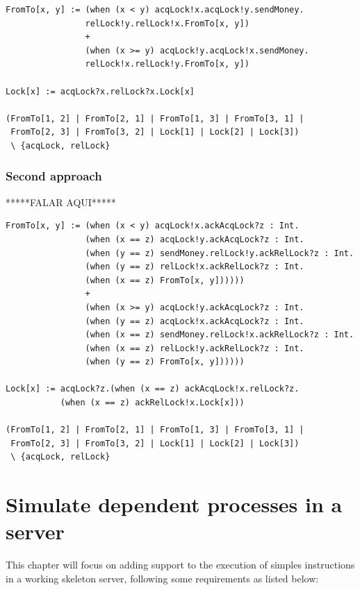 \documentclass{report}
\begin{document}
\begin{verbatim}
FromTo[x, y] := (when (x < y) acqLock!x.acqLock!y.sendMoney.
                relLock!y.relLock!x.FromTo[x, y]) 
                + 
                (when (x >= y) acqLock!y.acqLock!x.sendMoney.
                relLock!x.relLock!y.FromTo[x, y])

Lock[x] := acqLock?x.relLock?x.Lock[x]

(FromTo[1, 2] | FromTo[2, 1] | FromTo[1, 3] | FromTo[3, 1] | 
 FromTo[2, 3] | FromTo[3, 2] | Lock[1] | Lock[2] | Lock[3]) 
 \ {acqLock, relLock}
\end{verbatim}

\subsection*{Second approach}

*****FALAR AQUI*****

\begin{verbatim}
FromTo[x, y] := (when (x < y) acqLock!x.ackAcqLock?z : Int.
                (when (x == z) acqLock!y.ackAcqLock?z : Int.
                (when (y == z) sendMoney.relLock!y.ackRelLock?z : Int.
                (when (y == z) relLock!x.ackRelLock?z : Int.
                (when (x == z) FromTo[x, y]))))) 
                + 
                (when (x >= y) acqLock!y.ackAcqLock?z : Int.
                (when (y == z) acqLock!x.ackAcqLock?z : Int.
                (when (x == z) sendMoney.relLock!x.ackRelLock?z : Int.
                (when (x == z) relLock!y.ackRelLock?z : Int.
                (when (y == z) FromTo[x, y])))))

Lock[x] := acqLock?z.(when (x == z) ackAcqLock!x.relLock?z.
           (when (x == z) ackRelLock!x.Lock[x]))

(FromTo[1, 2] | FromTo[2, 1] | FromTo[1, 3] | FromTo[3, 1] | 
 FromTo[2, 3] | FromTo[3, 2] | Lock[1] | Lock[2] | Lock[3]) 
 \ {acqLock, relLock}
\end{verbatim}

\chapter{Simulate dependent processes in a server}

This chapter will focus on adding support to the execution of simples instructions in a working skeleton server, following some requirements as listed below:
\end{document}
